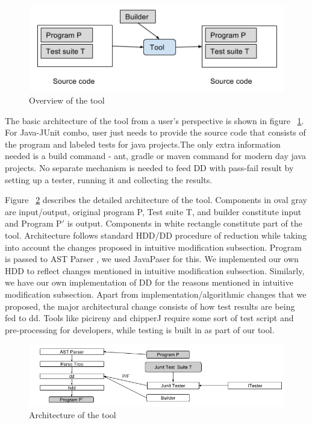 \begin{figure}
  \centering
  \includegraphics[width=1.0 \columnwidth]{basic_tool_architecture.png}
  \caption{Overview of the tool}
  \captionsetup{justification=centering}
  \label{fig:fig1}
\end{figure}



The basic architecture of the tool from a user's perspective is shown in figure ~\ref{fig:fig1}. For Java-JUnit combo, user just needs to provide the source code that consists of the program and labeled tests for java projects.The only extra information needed is a build command - ant, gradle or maven command for modern day java projects. No separate mechanism is needed to feed DD with pass-fail result by setting up a tester, running it and collecting the results. 

Figure ~\ref{fig:figDetailedToolArch} describes the detailed architecture of the tool. Components in oval gray are input/output, original program P, Test suite T, and builder constitute input and Program P$'$ is output. Components in white rectangle constitute part of the tool. Architecture follows standard HDD/DD procedure of reduction while taking into account the changes proposed in intuitive modification subsection. Program is passed to AST Parser \cite{javaparser}, we used JavaPaser for this. We implemented our own HDD to reflect changes mentioned in intuitive modification subsection. Similarly, we have our own implementation of DD for the reasons mentioned in intuitive modification subsection. Apart from implementation/algorithmic changes that we proposed, the major architectural change consists of how test results are being fed to dd. Tools like picireny and chipperJ require some sort of test script and pre-processing for developers, while testing is built in as part of our tool. 			

\begin{figure}
  \centering
  \includegraphics[width=1.8 \columnwidth]{detailed_tool_architecture.png}
  \caption{Architecture of the tool}
  \captionsetup{justification=centering}
  \label{fig:figDetailedToolArch}
\end{figure}